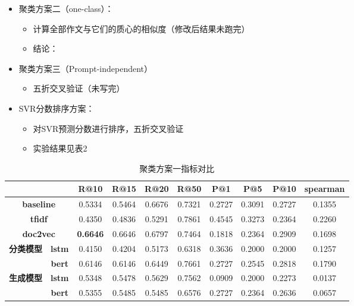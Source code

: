 \documentclass[11pt]{article}
\begin{document}
\begin{CJK}{UTF8}{gkai}
\begin{itemize}
\begin{itemize}
    \item 聚类方案二（one-class）：
    \begin{itemize}
      \item 计算全部作文与它们的质心的相似度（修改后结果未跑完）
      \item 结论：
    \end{itemize}
    \item 聚类方案三（Prompt-independent）
    \begin{itemize}
      \item 五折交叉验证（未写完）
    \end{itemize}
    \item SVR分数排序方案：
    \begin{itemize}
      \item 对SVR预测分数进行排序，五折交叉验证
      \item 实验结果见表2
    \end{itemize}
    
  \end{itemize}
\end{itemize}

\begin{table}[htbp]
    \centering
    \begin{tabular}{c|c|c|c|c|c|c|c|c|c}
      \hline
      \multicolumn{2}{c|}{} & \multicolumn{1}{c}{\textbf{R@10}} & \multicolumn{1}{c|}{\textbf{R@15}} & \multicolumn{1}{c|}{\textbf{R@20}} & \multicolumn{1}{c|}{\textbf{R@50}} & \multicolumn{1}{c|}{\textbf{P@1}} & \multicolumn{1}{c|}{\textbf{P@5}} & \multicolumn{1}{c|}{\textbf{P@10}} & \multicolumn{1}{c}{\textbf{spearman}} \\
      \hline
      \multicolumn{2}{c|}{\textbf{baseline}} & 0.5334  & 0.5464  & 0.6676  & 0.7321  & 0.2727  & 0.3091  & 0.2727  & 0.1355  \\
      \hline
      \multicolumn{2}{c|}{\textbf{tfidf}} & 0.4350  & 0.4836  & 0.5291  & 0.7861  & 0.4545  & 0.3273  & 0.2364  & 0.2260  \\
      \hline
      \multicolumn{2}{c|}{\textbf{doc2vec}} & \textcolor[rgb]{ 1,  0,  0}{\textbf{0.6646 }} & 0.6646  & 0.6797  & 0.7464  & 0.1818  & 0.2364  & 0.2909  & 0.1698  \\
      \hline
      \multirow{2}[0]{*}{\textbf{分类模型}} & \textbf{lstm} & 0.4150  & 0.4204  & 0.5173  & 0.6318  & 0.3636  & 0.2000  & 0.2000  & 0.1257  \\
      & \textbf{bert} & 0.6146  & 0.6146  & 0.6449  & 0.7661  & 0.2727  & 0.2545  & 0.2818  & 0.1790  \\
      \hline
      \multirow{2}[0]{*}{\textbf{生成模型}} & \textbf{lstm} & 0.5348  & 0.5478  & 0.5629  & 0.7562  & 0.0909  & 0.2000  & 0.2273  & 0.0137  \\
      & \textbf{bert} & 0.5355  & 0.5485  & 0.5485  & 0.6576  & 0.2727  & 0.2364  & 0.2636  & 0.0657  \\
      \hline
    \end{tabular}%
    \caption{聚类方案一指标对比}
  \label{tab:addlabel}%
\end{table}%



\end{CJK}
\end{document}
